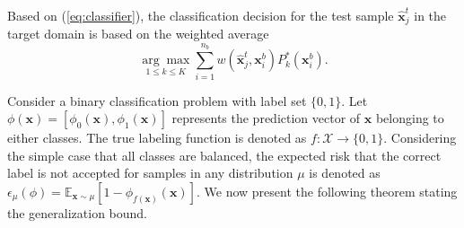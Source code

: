 \documentclass[journal]{IEEEtran}
\begin{document}
Based on (\ref{eq:classifier}), the classification decision for the test sample $\widehat{\boldsymbol{x}}_j^{t}$ in the target domain is based on the weighted average
\begin{equation}
\label{eq:argmax_reweight}
     \underset{1 \leq k \leq K}{\arg \max }\sum_{i=1}^{n_b} w\left(\widehat{\boldsymbol{x}}_j^{t},\boldsymbol{x}_i^{b}\right) P^*_k(\boldsymbol{x}^{b}_{i}).
\end{equation}

Consider a binary classification problem with label set $\{0,1\}$.
Let $\phi(\boldsymbol{x})=[\phi_0(\boldsymbol{x}),\phi_1(\boldsymbol{x})]$ represents the prediction vector of $\boldsymbol{x}$ belonging to either classes.
The true labeling function is denoted as $f:\mathcal{X}\rightarrow\{0,1\}$.
Considering the simple case that all classes are balanced, 
the expected risk that the correct label is not accepted for samples in any distribution $\mu$ is denoted as $\epsilon_{\mu}\left(\phi\right)=\mathbb{E}_{\boldsymbol{x}\sim\mu}[1-\phi_{f(\boldsymbol{x})}(\boldsymbol{x})]$.
We now present the following theorem stating the generalization bound.
\end{document}

